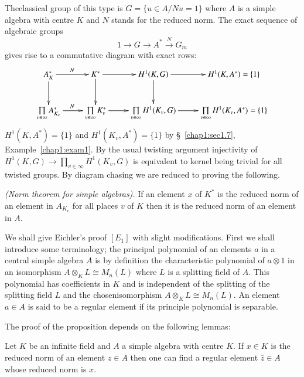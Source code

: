   The\pageoriginale classical group of this type is $G = \bigg\{ u \in
  A \bigg/ Nu=1 
  \bigg\}$ where $A$ is a simple algebra with centre $K$ and $N$
  stands for the reduced norm. The exact sequence of algebraic groups 
    $$
  1 \rightarrow G \rightarrow A^* \xrightarrow{N} G_m 
  $$ 
  gives rise to a commutative diagram with exact rows:
\[
\xymatrix{
A^{\ast}_K  \ar[r]^N \ar[d] & K^\ast\ar[r] \ar[d] & H^1 (K,G) \ar[r]
\ar[d] & H^1 (K,A^{\ast}) = \{1\}\\
\prod\limits_{v\in\infty} A^\ast_{K_v} \ar[r]^N &
\prod\limits_{v\in\infty} K^\ast_v \ar[r] & \prod\limits_{v\in\infty}
H^1 (K_v, G) \ar[r] & \prod\limits_{v\in\infty} H^1 (K_v, A^\ast) = \{1\}
}
\]  
    $H^1(K,A^*) = \{1\}$ and $H^1(K_v, A^*)= \{1\}$ by \S~\ref{chap1:sec1.7}, 
Example~\ref{chap1:exam1}. By the usual twisting argument injectivity
of $H^1(K,G) 
\rightarrow \prod\limits_{v \in \infty}H^1(K_v,G)$ is equivalent to
kernel being trivial for all twisted groups. By diagram chasing we are
reduced to proving the following. 
    
\begin{prop*}{\em (Norm theorem for simple algebras).}
 If an element  $x$ of $K^*$ is the reduced norm of an element in
 $A_{K_v}$ for all places $v$ of $K$ then it is the reduced norm of an
 element in $A$.   
 \end{prop*}        
 
 We shall give Eichler's proof $[E_1]$ with slight
 modifications. First we shall introduce some terminology; the
 principal polynomial of an elements $a$ in a central simple algebra
 $A$ is by definition the characteristic polynomial of $a \otimes 1$ in
 an isomorphism $A \otimes_KL \cong M_n (L)$ where $L$ is a splitting
 field of $A$. This polynomial has coefficients in $K$ and is
 independent of the splitting of the splitting field $L$ and the
 chosen\pageoriginale isomorphism  $A \otimes_KL \cong M_n(L)$. An
 element $a \in A$ is said to be a regular element if its principle
 polynomial is separable. 
 
 The proof of the proposition depends on the following lemmas:
 
\begin{lemb}\label{chap5:lema} 
Let $K$ be an infinite field and $A$ a simple algebra with centre
$K$. If $x \in K$ is the reduced norm of an element $z \in A$ then one
can find a regular element $\bar{z} \in A$ whose reduced norm is $x$.  
\end{lemb}
   
